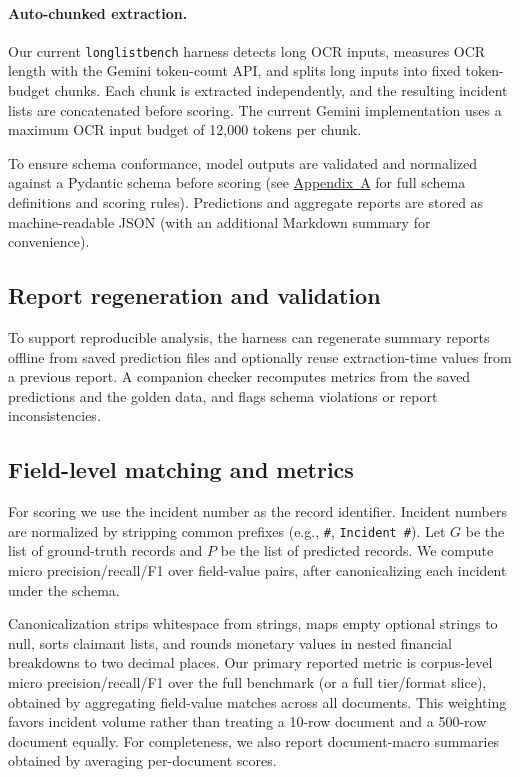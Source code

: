 \paragraph{Auto-chunked extraction.}
Our current \texttt{longlistbench} harness detects long OCR inputs, measures OCR length with the Gemini token-count API, and splits long inputs into fixed token-budget chunks. Each chunk is extracted independently, and the resulting incident lists are concatenated before scoring. The current Gemini implementation uses a maximum OCR input budget of 12{,}000 tokens per chunk.

To ensure schema conformance, model outputs are validated and normalized against a Pydantic schema before scoring (see \hyperref[sec:appendix-schemas]{Appendix~A} for full schema definitions and scoring rules). Predictions and aggregate reports are stored as machine-readable JSON (with an additional Markdown summary for convenience).

\subsection{Report regeneration and validation}
To support reproducible analysis, the harness can regenerate summary reports offline from saved prediction files and optionally reuse extraction-time values from a previous report. A companion checker recomputes metrics from the saved predictions and the golden data, and flags schema violations or report inconsistencies.

\subsection{Field-level matching and metrics}
For scoring we use the incident number as the record identifier. Incident numbers are normalized by stripping common prefixes (e.g., \texttt{\#}, \texttt{Incident \#}). Let $G$ be the list of ground-truth records and $P$ be the list of predicted records. We compute micro precision/recall/F1 over field-value pairs, after canonicalizing each incident under the schema.

Canonicalization strips whitespace from strings, maps empty optional strings to null, sorts claimant lists, and rounds monetary values in nested financial breakdowns to two decimal places. Our primary reported metric is corpus-level micro precision/recall/F1 over the full benchmark (or a full tier/format slice), obtained by aggregating field-value matches across all documents. This weighting favors incident volume rather than treating a 10-row document and a 500-row document equally. For completeness, we also report document-macro summaries obtained by averaging per-document scores.

